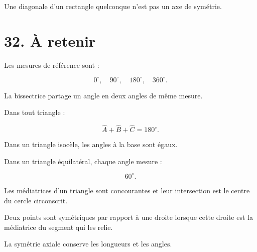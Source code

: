 Une diagonale d’un rectangle quelconque n’est pas un axe de symétrie.

\section{32. À retenir}

Les mesures de référence sont :

\[
0^\circ,\quad
90^\circ,\quad
180^\circ,\quad
360^\circ.
\]

La bissectrice partage un angle en deux angles de même mesure.

Dans tout triangle :

\[
\boxed{
\widehat{A}+\widehat{B}+\widehat{C}=180^\circ
}.
\]

Dans un triangle isocèle, les angles à la base sont égaux.

Dans un triangle équilatéral, chaque angle mesure :

\[
60^\circ.
\]

Les médiatrices d’un triangle sont concourantes et leur intersection est le centre du cercle circonscrit.

Deux points sont symétriques par rapport à une droite lorsque cette droite est la médiatrice du segment qui les relie.

La symétrie axiale conserve les longueurs et les angles.
